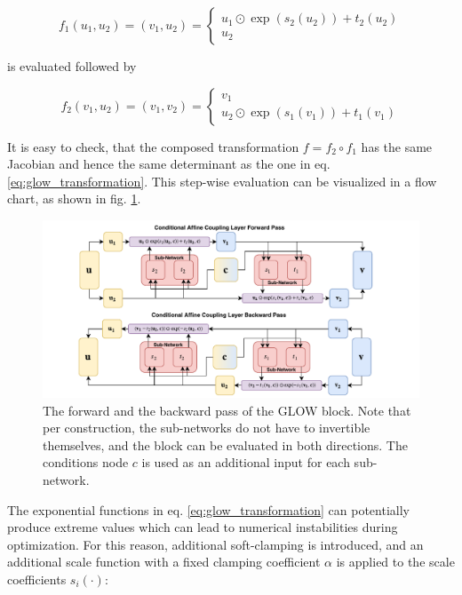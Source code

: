 \begin{equation*}
	f_1(u_1, u_2) = (v_1, u_2) = \begin{cases}
		u_1 \odot \exp(s_2(u_2)) + t_2(u_2) \\
		u_2
	\end{cases}
\end{equation*}

is evaluated followed by

\begin{equation*}
	f_2(v_1, u_2) = (v_1, v_2) = \begin{cases}
		v_1 \\
		 u_2 \odot \exp(s_1(v_1)) + t_1(v_1)
	\end{cases}
\end{equation*}

It is easy to check, that the composed transformation $f = f_2 \circ f_1$ has the same Jacobian and hence the same determinant as the one in eq. \ref{eq:glow_transformation}. This step-wise evaluation can be visualized in a flow chart, as shown in fig. \ref{fig:glow}.

\begin{figure}[h!]
	\centering
	\includegraphics[width=\linewidth]{figures/neural_networks/glow.pdf}
	\caption{The forward and the backward pass of the GLOW block. Note that per construction, the sub-networks do not have to invertible themselves, and the block can be evaluated in both directions. The conditions node $c$ is used as an additional input for each sub-network. \cite{Ksoll_2020}}
	\label{fig:glow}
\end{figure}

The exponential functions in eq. \ref{eq:glow_transformation} can potentially produce extreme values which can lead to numerical instabilities during optimization. For this reason, additional soft-clamping is introduced, and an additional scale function with a fixed clamping coefficient $\alpha$ is applied to the scale coefficients $s_i(\cdot)$:

